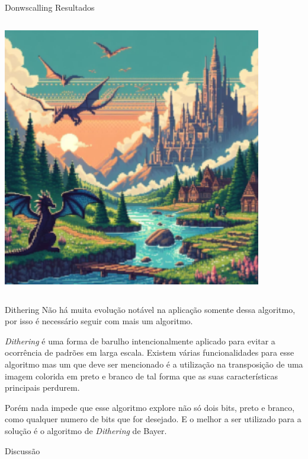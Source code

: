 \documentclass[compress,12pt]{beamer}
\begin{document}
\begin{frame}{Donwscalling Resultados}
\begin{columns}
\begin{column}{0.5\textwidth}
\begin{center}
				\includegraphics[width=0.85\textwidth]{Images/aiGeneratedPixelArt-2-T.png}
			\end{center}
		\end{column}
	\end{columns}
\end{frame}

\begin{frame}{Dithering}
    Não há muita evolução notável na aplicação somente dessa algoritmo, por isso é necessário seguir com mais um algoritmo.
    
    \textit{Dithering} é uma forma de barulho intencionalmente aplicado para evitar a ocorrência de padrões em larga escala. Existem várias funcionalidades para esse algoritmo mas um que deve ser mencionado é a utilização na transposição de uma imagem colorida em preto e branco de tal forma que as suas características principais perdurem.

    Porém nada impede que esse algoritmo explore não só dois bits, preto e branco, como qualquer numero de bits que for desejado. E o melhor a ser utilizado para a solução é o algoritmo de \textit{Dithering} de Bayer.     
\end{frame}
\begin{frame}[standout]
	\centering\large
    Discussão
\end{frame}
\end{document}
